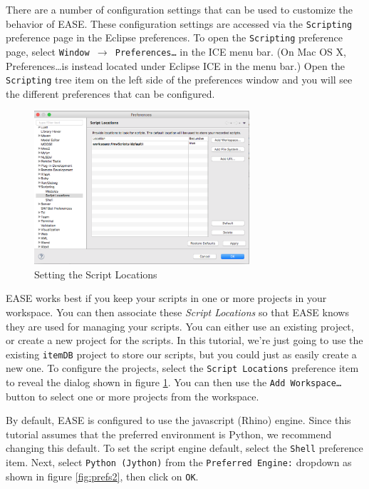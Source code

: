 There are a number of configuration settings that can be used to customize the
behavior of EASE. These configuration settings are accessed via the \texttt{Scripting}
preference page in the Eclipse preferences. To open the \texttt{Scripting}
preference page, select \texttt{Window $\rightarrow$ Preferences\ldots} in the
ICE menu bar. (On Mac OS X, Preferences\ldots is instead located under Eclipse
ICE in the menu bar.) Open the \texttt{Scripting} tree item on the left side of
the preferences window and you will see the different preferences that can be
configured.

\begin{figure}[!ht]
\centering
\includegraphics[width=8cm]{images/scripting-prefs1}
\caption{Setting the Script Locations}
\label{fig:prefs1}
\end{figure}

EASE works best if you keep your scripts in one or more projects in
your workspace. You can then associate these \emph{Script Locations} so
that EASE knows they are used for managing your scripts. You can either use an
existing project, or create a new project for the scripts. In this tutorial,
we're just going to use the existing \texttt{itemDB} project to store our scripts, but
you could just as easily create a new one. To configure the projects, select the
\texttt{Script Locations} preference item to reveal the dialog shown in figure
\ref{fig:prefs1}. You can then use the \texttt{Add Workspace\ldots} button to
select one or more projects from the workspace.

By default, EASE is configured to use the javascript (Rhino) engine.
Since this tutorial assumes that the preferred environment is Python, we recommend changing
this default. To set the script engine default, select the
\texttt{Shell} preference item. Next, select \texttt{Python (Jython)} from
the \texttt{Preferred Engine:} dropdown as shown in figure \ref{fig:prefs2},
then click on \texttt{OK}.


